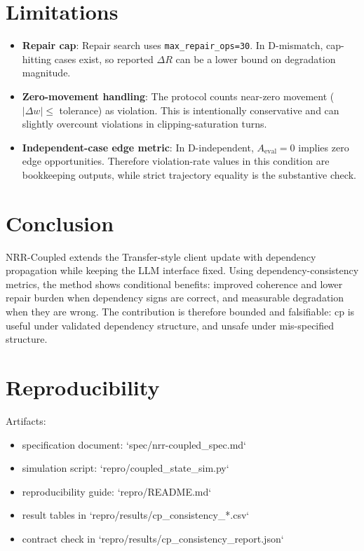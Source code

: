 \documentclass[11pt,a4paper]{article}
\begin{document}
\section{Limitations}
\begin{itemize}
  \item \textbf{Repair cap}: Repair search uses \texttt{max\_repair\_ops=30}. In D-mismatch, cap-hitting cases exist, so reported \(\Delta R\) can be a lower bound on degradation magnitude.
  \item \textbf{Zero-movement handling}: The protocol counts near-zero movement (\(|\Delta w|\le\) tolerance) as violation. This is intentionally conservative and can slightly overcount violations in clipping-saturation turns.
  \item \textbf{Independent-case edge metric}: In D-independent, \(A_{\text{eval}}=0\) implies zero edge opportunities. Therefore violation-rate values in this condition are bookkeeping outputs, while strict trajectory equality is the substantive check.
\end{itemize}

\section{Conclusion}
NRR-Coupled extends the Transfer-style client update with dependency propagation while keeping the LLM interface fixed. Using dependency-consistency metrics, the method shows conditional benefits: improved coherence and lower repair burden when dependency signs are correct, and measurable degradation when they are wrong. The contribution is therefore bounded and falsifiable: cp is useful under validated dependency structure, and unsafe under mis-specified structure.

\section{Reproducibility}
Artifacts:
\begin{itemize}
  \item specification document: `spec/nrr-coupled\_spec.md`
  \item simulation script: `repro/coupled\_state\_sim.py`
  \item reproducibility guide: `repro/README.md`
  \item result tables in `repro/results/cp\_consistency\_*.csv`
  \item contract check in `repro/results/cp\_consistency\_report.json`
\end{itemize}
\end{document}
